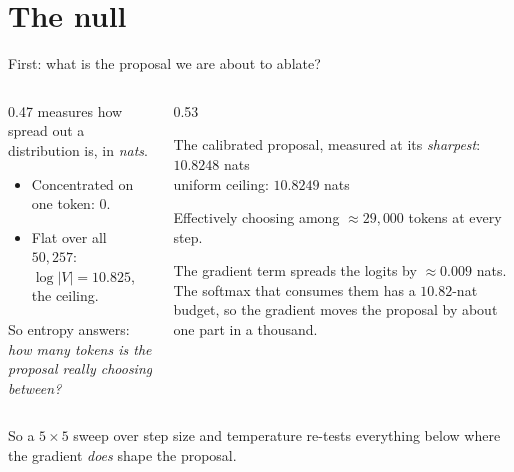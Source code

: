 \documentclass{beamer}
\begin{document}
\section{The null}

\begin{frame}{First: what is the proposal we are about to ablate?}
  \begin{columns}[T]
    \begin{column}{0.47\textwidth}
      \small
       measures how spread out a distribution is, in \emph{nats}.
      \begin{itemize}\small
        \item Concentrated on one token: $0$.
        \item Flat over all $50{,}257$: $\log|V| = 10.825$, the ceiling.
      \end{itemize}
      \vspace{0.3em}
      {\small So entropy answers: \emph{how many tokens is the proposal really choosing between?}}
    \end{column}
    \begin{column}{0.53\textwidth}
      \begin{block}{The calibrated proposal, measured}
        \small
        at its \emph{sharpest}: $10.8248$ nats\\
        uniform ceiling: $10.8249$ nats
      \end{block}
      \vspace{-0.2em}
      {\small Effectively choosing among $\approx 29{,}000$ tokens at every step.}
      \vspace{0.5em}

      {\small The gradient term spreads the logits by $\approx 0.009$ nats. The softmax that
      consumes them has a $10.82$-nat budget, so the gradient moves the proposal by about one
      part in a thousand.}
      \vspace{0.4em}

    \end{column}
  \end{columns}
  \vspace{0.4em}
  \begin{center}\small
  So a $5\times5$ sweep over step size and temperature re-tests everything below where the gradient \emph{does} shape the proposal.
  \end{center}
\end{frame}
\end{document}
